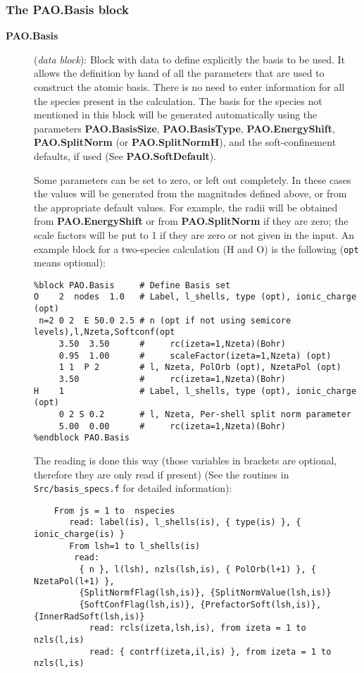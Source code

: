 \documentclass[11pt]{article}
\begin{document}
\subsubsection{The PAO.Basis block}
\begin{description}

\item[{\bf PAO.Basis}] ({\it data block}): 
Block with data to define explicitly the
basis to be used.  It allows the definition by hand of all the
parameters that are used to construct the atomic basis. There is no
need to enter information for all the species present in the
calculation. The basis for the species not mentioned in
this block will be generated automatically using the parameters {\bf
PAO.BasisSize}, {\bf PAO.BasisType}, {\bf PAO.EnergyShift}, {\bf
PAO.SplitNorm} (or {\bf PAO.SplitNormH}), and the soft-confinement
defaults, if used (See {\bf PAO.SoftDefault}).

Some parameters can be set to zero, or
left out completely.  In these cases the values will be generated from the
magnitudes defined above, or from the appropriate default values. For
example, the radii will be obtained from {\bf
PAO.EnergyShift} or from {\bf PAO.SplitNorm} if they are zero; the
scale factors will be put to 1 if they are zero or not given in the
input.  An example block for a two-species calculation (H and O) is
the following ({\tt opt} means optional):

\begin{verbatim}
%block PAO.Basis     # Define Basis set
O    2  nodes  1.0   # Label, l_shells, type (opt), ionic_charge (opt)
 n=2 0 2  E 50.0 2.5 # n (opt if not using semicore levels),l,Nzeta,Softconf(opt
     3.50  3.50      #     rc(izeta=1,Nzeta)(Bohr)
     0.95  1.00      #     scaleFactor(izeta=1,Nzeta) (opt)
     1 1  P 2        # l, Nzeta, PolOrb (opt), NzetaPol (opt)
     3.50            #     rc(izeta=1,Nzeta)(Bohr)
H    1               # Label, l_shells, type (opt), ionic_charge (opt)
     0 2 S 0.2       # l, Nzeta, Per-shell split norm parameter
     5.00  0.00      #     rc(izeta=1,Nzeta)(Bohr)
%endblock PAO.Basis
\end{verbatim}

\noindent
The reading is done this way (those variables in brackets are
optional, therefore they are only read if present) (See
the routines in {\tt Src/basis\_specs.f} for detailed information):

\begin{verbatim}
    From js = 1 to  nspecies
       read: label(is), l_shells(is), { type(is) }, { ionic_charge(is) }
       From lsh=1 to l_shells(is)
        read:
         { n }, l(lsh), nzls(lsh,is), { PolOrb(l+1) }, { NzetaPol(l+1) },
         {SplitNormfFlag(lsh,is)}, {SplitNormValue(lsh,is)}
         {SoftConfFlag(lsh,is)}, {PrefactorSoft(lsh,is)}, {InnerRadSoft(lsh,is)}
           read: rcls(izeta,lsh,is), from izeta = 1 to nzls(l,is)
           read: { contrf(izeta,il,is) }, from izeta = 1 to nzls(l,is)
\end{verbatim}


\end{description}
\end{document}
